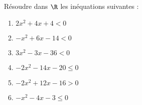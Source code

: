 \documentclass[a4paper,11pt,exos]{nsi} %
\begin{document}
\maketitle

Résoudre dans $\R$ les inéquations suivantes :
\begin{multicols}{2}
    \begin{enumerate}[itemsep=1em]
        \item $2x^2+4x+4< 0$
	    \item $-x^2+6x-14< 0$
	    \item $3x^2-3x-36< 0$
	    \item $-2x^2-14x-20\leqslant 0$
	    \item $-2x^2+12x-16>0$
	    \item $-x^2-4x-3\leqslant 0$
    \end{enumerate}
\end{multicols}

\end{document}

